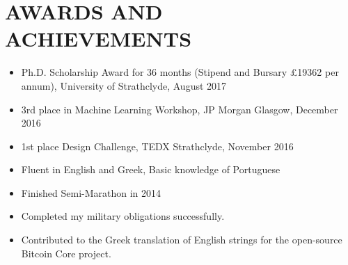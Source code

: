 \documentclass[11pt,a4paper,roman]{moderncv}
\begin{document}
{\section{AWARDS AND ACHIEVEMENTS}
\begin{minipage}{\maincolumnwidth}%
	\small{
    	\begin{itemize}
          \item Ph.D. Scholarship Award for 36 months (Stipend and Bursary £19362 per annum), University of Strathclyde, August 2017
          \item 3rd place in Machine Learning Workshop, JP Morgan Glasgow, December 2016
          \item 1st place Design Challenge, TEDX Strathclyde, November 2016
          \item Fluent in English and Greek, Basic knowledge of Portuguese
          \item Finished Semi-Marathon in 2014
          \item Completed my military obligations successfully.
          \item Contributed to the Greek translation of English strings for the open-source Bitcoin Core project.
		\end{itemize}}%
\end{minipage}%


}
\end{document}
